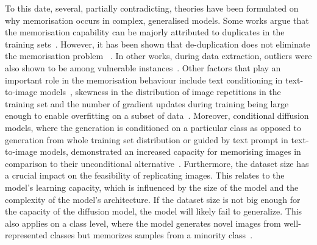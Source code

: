 \documentclass[conference]{IEEEtran}
\begin{document}
To this date, several, partially contradicting, theories have been formulated on why memorisation occurs in complex, generalised models.
Some works argue that the memorisation capability can be majorly attributed to duplicates in the training sets~\cite{wen_canary_2023}. %
However, it has been shown that de-duplication does not eliminate the memorisation problem ~\cite{somepalli_understanding_2023, carlini_extracting_2023}. 
In other works, during data extraction, outliers were also shown to be among vulnerable instances~\cite{carlini_extracting_2023, burg_memorization_2021}.
Other factors that play an important role in the memorisation behaviour include text conditioning in text-to-image models~\cite{somepalli_understanding_2023}, skewness in the distribution of image repetitions in the training set and the number of gradient updates during training being large enough to enable overfitting on a subset of data~\cite{somepalli_diffusion_2022}. Moreover, conditional diffusion models, where the generation is conditioned on a particular class as opposed to generation from whole training set distribution or guided by text prompt in text-to-image models, demonstrated an increased capacity for memorising images in comparison to their unconditional alternative~\cite{gu_memorization_2023}. %
Furthermore, the dataset size has a crucial impact on the feasibility of replicating images.
This relates to the model's learning capacity, which is influenced by the size of the model and the complexity of the model's architecture. If the dataset size is not big enough for the capacity of the diffusion model, the model will likely fail to generalize. This also applies on a class level, where the model generates novel images from well-represented classes but memorizes samples from a minority class~\cite{yoon_diffusion_2023}.
\end{document}
